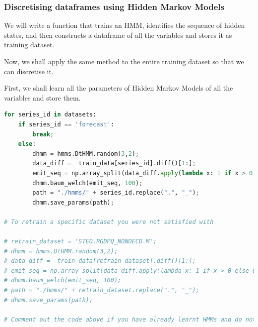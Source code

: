 \hypertarget{discretising-dataframes-using-hidden-markov-models}{%
\subsubsection{Discretising dataframes using Hidden Markov
Models}\label{discretising-dataframes-using-hidden-markov-models}}

We will write a function that trains an HMM, identifies the sequence of
hidden states, and then constructs a dataframe of all the variables and
stores it as training dataset.

Now, we shall apply the same method to the entire training dataset so
that we can discretise it.

First, we shall learn all the parameters of Hidden Markov Models of all
the variables and store them.

\begin{lstlisting}[language=Python]
for series_id in datasets:
    if series_id == 'forecast':
        break;
    else:
        dhmm = hmms.DtHMM.random(3,2);
        data_diff =  train_data[series_id].diff()[1:];
        emit_seq = np.array_split(data_diff.apply(lambda x: 1 if x > 0 else 0).values, 32);
        dhmm.baum_welch(emit_seq, 100);
        path = "./hmms/" + series_id.replace(".", "_");
        dhmm.save_params(path);

# To retrain a specific dataset you were not satisfied with

# retrain_dataset = 'STEO.RGDPQ_NONOECD.M';
# dhmm = hmms.DtHMM.random(3,2);
# data_diff =  train_data[retrain_dataset].diff()[1:];
# emit_seq = np.array_split(data_diff.apply(lambda x: 1 if x > 0 else 0).values, 32);
# dhmm.baum_welch(emit_seq, 100);
# path = "./hmms/" + retrain_dataset.replace(".", "_");
# dhmm.save_params(path);

# Comment out the code above if you have already learnt HMMs and do not want to relearn them
\end{lstlisting}

